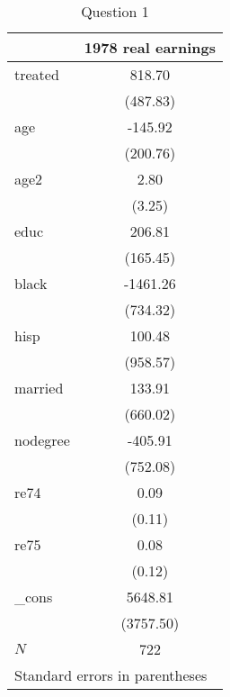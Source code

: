 \begin{table}[htbp]\centering
\caption{Question 1\label{q1}}
\begin{tabular}{l*{1}{c}}
\toprule
            &\multicolumn{1}{c}{1978 real earnings}\\
\midrule
treated     &      818.70\\
            &    (487.83)\\
\addlinespace
age         &     -145.92\\
            &    (200.76)\\
\addlinespace
age2        &        2.80\\
            &      (3.25)\\
\addlinespace
educ        &      206.81\\
            &    (165.45)\\
\addlinespace
black       &    -1461.26\\
            &    (734.32)\\
\addlinespace
hisp        &      100.48\\
            &    (958.57)\\
\addlinespace
married     &      133.91\\
            &    (660.02)\\
\addlinespace
nodegree    &     -405.91\\
            &    (752.08)\\
\addlinespace
re74        &        0.09\\
            &      (0.11)\\
\addlinespace
re75        &        0.08\\
            &      (0.12)\\
\addlinespace
\_cons      &     5648.81\\
            &   (3757.50)\\
\midrule
\(N\)       &         722\\
\bottomrule
\multicolumn{2}{l}{\footnotesize Standard errors in parentheses}\\
\end{tabular}
\end{table}
